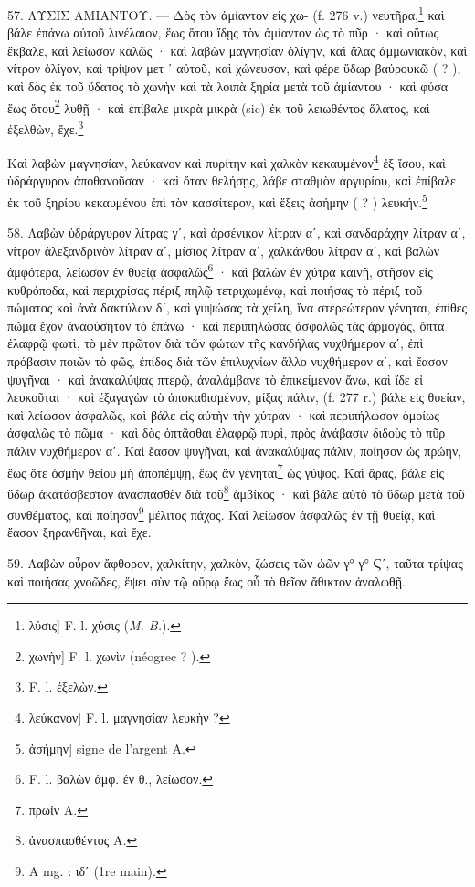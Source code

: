 \documentclass[a4paper, 11pt, oneside, polutonikogreek, french]{article}
\begin{document}
57. ΛΥΣΙΣ ΑΜΙΑΝΤΟΥ. --- Δὸς τὸν ἀμίαντον εἰς χω- (f. 276 v.) νευτῆρα,\footnote{λύσις] F. l. χύσις (\emph{M. B.}).} καὶ βάλε ἐπάνω αὐτοῦ λινέλαιον, ἕως ὅτου ἴδῃς τὸν ἀμίαντον ὡς τὸ πῦρ · καὶ οὕτως ἔκβαλε, καὶ λείωσον καλῶς · καὶ λαβὼν μαγνησίαν ὀλίγην, καὶ ἅλας ἀμμωνιακὸν, καὶ νίτρον ὀλίγον, καὶ τρίψον μετ ᾽ αὐτοῦ, καὶ χώνευσον, καὶ φέρε ὕδωρ βαὐρουκῶ ( ? ), καὶ δὸς ἐκ τοῦ ὕδατος τὸ χωνὴν καὶ τὰ λοιπὰ ξηρία μετὰ τοῦ ἀμίαντου · καὶ φύσα ἕως ὅτου\footnote{χωνὴν] F. l. χωνὶν (néogrec ? ).} λυθῇ · καὶ ἐπίβαλε μικρὰ μικρὰ (sic) ἐκ τοῦ λειωθέντος ἅλατος, καὶ ἐξελθὼν, ἔχε.\footnote{F. l. ἐξελὼν.}

Καὶ λαβὼν μαγνησίαν, λεύκανον καὶ πυρίτην καὶ χαλκὸν κεκαυμένον\footnote{λεύκανον] F. l. μαγνησίαν λευκὴν ?} ἐξ ἴσου, καὶ ὑδράργυρον ἀποθανοῦσαν · καὶ ὅταν θελήσῃς, λάβε σταθμὸν ἀργυρίου, καὶ ἐπίβαλε ἐκ τοῦ ξηρίου κεκαυμένου ἐπὶ τὸν κασσίτερον, καὶ ἕξεις ἀσήμην ( ? ) λευκήν.\footnote{ἀσήμην] signe de l'argent A.}

58. Λαβὼν ὑδράργυρον λίτρας γʹ, καὶ ἀρσένικον λίτραν αʹ, καὶ σανδαράχην λίτραν αʹ, νίτρον ἀλεξανδρινὸν λίτραν αʹ, μίσιος λίτραν αʹ, χαλκάνθου λίτραν αʹ, καὶ βαλὼν ἀμφότερα, λείωσον ἐν θυείᾳ ἀσφαλῶς\footnote{F. l. βαλὼν ἀμφ. ἐν θ., λείωσον.} · καὶ βαλὼν ἐν χύτρᾳ καινῇ, στῆσον εἰς κυθρόποδα, καὶ περιχρίσας πέριξ πηλῷ τετριχωμένῳ, καὶ ποιήσας τὸ πέριξ τοῦ πώματος καὶ ἀνὰ δακτύλων δʹ, καὶ γυψώσας τὰ χείλη, ἵνα στερεώτερον γένηται, ἐπίθες πῶμα ἔχον ἀναφύσητον τὸ ἐπάνω · καὶ περιπηλώσας ἀσφαλῶς τὰς ἀρμογὰς, ὄπτα ἐλαφρῷ φωτὶ, τὸ μὲν πρῶτον διὰ τῶν φώτων τῆς κανδήλας νυχθήμερον αʹ, ἐπὶ πρόβασιν ποιῶν τὸ φῶς, ἐπίδος διὰ τῶν ἐπιλυχνίων ἄλλο νυχθήμερον αʹ, καὶ ἔασον ψυγῆναι · καὶ ἀνακαλύψας πτερῷ, ἀναλάμβανε τὸ ἐπικείμενον ἄνω, καὶ ἴδε εἰ λευκοῦται · καὶ ἐξαγαγὼν τὸ ἀποκαθισμένον, μίξας πάλιν, (f. 277 r.) βάλε εἰς θυείαν, καὶ λείωσον ἀσφαλῶς, καὶ βάλε εἰς αὐτὴν τὴν χύτραν · καὶ περιπήλωσον ὁμοίως ἀσφαλῶς τὸ πῶμα · καὶ δὸς ὀπτᾶσθαι ἐλαφρῷ πυρὶ, πρὸς ἀνάβασιν διδοὺς τὸ πῦρ πάλιν νυχθήμερον αʹ. Καὶ ἔασον ψυγῆναι, καὶ ἀνακαλύψας πάλιν, ποίησον ὡς πρώην, ἕως ὅτε ὀσμὴν θείου μὴ ἀποπέμψῃ, ἕως ἂν γένηται\footnote{πρωίν A.} ὠς γύψος. Καὶ ἄρας, βάλε εἰς ὕδωρ ἀκατάσβεστον ἀνασπασθὲν διὰ τοῦ\footnote{ἀνασπασθέντος A.} ἀμβίκος · καὶ βάλε αὐτὸ τὸ ὕδωρ μετὰ τοῦ συνθέματος, καὶ ποίησον\footnote{A mg. : ιδʹ (1re main).} μέλιτος πάχος. Καὶ λείωσον ἀσφαλῶς ἐν τῇ θυείᾳ, καὶ ἔασον ξηρανθῆναι, καὶ ἔχε.

59. Λαβὼν οὖρον ἄφθορον, χαλκίτην, χαλκὸν, ζώσεις τῶν ὠῶν γ° γ° Ϛʹ, ταῦτα τρίψας καὶ ποιήσας χνοῶδες, ἕψει σὺν τῷ οὔρῳ ἕως οὗ τὸ θεῖον ἄθικτον ἀναλωθῇ.
\end{document}
